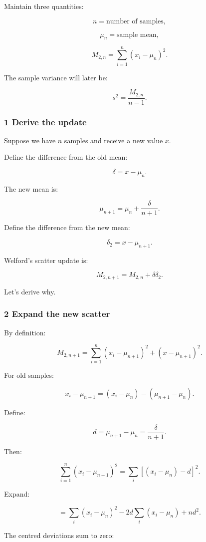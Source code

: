 Maintain three quantities:

\[
 n=\text{number of samples},
\]

\[
 \mu_n=\text{sample mean},
\]

\[
 M_{2,n}= \sum_{i=1}^{n}(x_i-\mu_n)^2.
\]

The sample variance will later be:

\[
 s^2=\frac{M_{2,n}}{n-1}.
\]

\subsubsection{1 Derive the update}\label{02-foundations-ii-ch030-derive-the-update}

Suppose we have \(n\) samples and receive a new value \(x\).

Define the difference from the old mean:

\[
 \boxed{\delta=x-\mu_n}.
\]

The new mean is:

\[
 \boxed{ \mu_{n+1} = \mu_n+\frac{\delta}{n+1} }.
\]

Define the difference from the new mean:

\[
 \boxed{ \delta_2=x-\mu_{n+1} }.
\]

Welford's scatter update is:

\[
 \boxed{ M_{2,n+1} = M_{2,n}+\delta\delta_2 }.
\]

Let's derive why.

\subsubsection{2 Expand the new scatter}\label{02-foundations-ii-ch030-expand-the-new-scatter}

By definition:

\[
 M_{2,n+1} = \sum_{i=1}^{n}(x_i-\mu_{n+1})^2 + (x-\mu_{n+1})^2.
\]

For old samples:

\[
 x_i-\mu_{n+1} = (x_i-\mu_n)-(\mu_{n+1}-\mu_n).
\]

Define:

\[
 d=\mu_{n+1}-\mu_n=\frac{\delta}{n+1}.
\]

Then:

\[
 \sum_{i=1}^{n}(x_i-\mu_{n+1})^2 = \sum_i[(x_i-\mu_n)-d]^2.
\]

Expand:

\[
 = \sum_i(x_i-\mu_n)^2 - 2d\sum_i(x_i-\mu_n) + nd^2.
\]

The centred deviations sum to zero:

